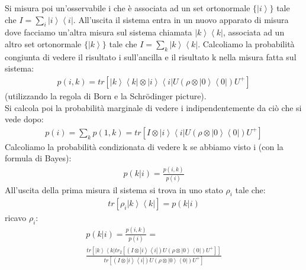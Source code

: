 Si misura poi un'osservabile i che è associata ad un set ortonormale $\{\left|i\right\rangle\}$ tale che $I=\sum_{i}\left|i\right\rangle\left\langle i\right|$.
All'uscita il sistema entra in un nuovo apparato di misura dove facciamo un'altra misura sul sistema chiamata $\left|k\right\rangle\left\langle k\right|$, associata ad un altro set ortonormale $\{\left|k\right\rangle\}$ tale che $I=\sum_{k}\left|k\right\rangle\left\langle k\right|$.
Calcoliamo la probabilità congiunta di vedere il risultato i sull'ancilla e il risultato k nella misura fatta sul sistema:
\begin{equation}\begin{split}
p(i,k)=tr[\left|k\right\rangle\left\langle k \right|\otimes\left|i\right\rangle\left\langle i \right| U (\rho\otimes \left|0\right\rangle\left\langle 0\right|)U^+]
\end{split}\end{equation}
(utilizzando la regola di Born e la Schrödinger picture). \\
Si calcola poi la probabilità marginale di vedere i indipendentemente da ciò che si vede dopo:
\begin{equation}\begin{split}
p(i)=\sum_{k}p(1,k)=tr[I\otimes \left|i\right\rangle \left\langle i\right| U (\rho\otimes \left|0\right\rangle\left\langle 0\right|) U^+]
\end{split}\end{equation}
Calcoliamo la probabilità condizionata di vedere k se abbiamo visto i (con la formula di Bayes):
\begin{equation}\begin{split}
p(k|i)=\frac{p(i,k)}{p(i)}
\end{split}\end{equation}
All'uscita della prima misura il sistema si trova in uno stato $\rho_{i}$ tale che:
\begin{equation}\begin{split}
tr[\rho_{i}\left|k\right\rangle\left\langle k\right|]=p(k|i)
\end{split}\end{equation}
ricavo $\rho_{i}$:
\begin{equation}\begin{split}
p(k|i)=\frac{p(i,k)}{p(i)}=\\
\frac{tr[\left|k\right\rangle\left\langle k\right| tr_{2}[(I\otimes\left|i\right\rangle\left\langle i\right|)U(\rho\otimes\left|0\right\rangle\left\langle 0\right|)U^+]]}{tr[(I\otimes\left|i\right\rangle\left\langle i\right|) U (\rho\otimes\left|0\right\rangle\left\langle 0\right|)U^+]}
\end{split}\end{equation}

